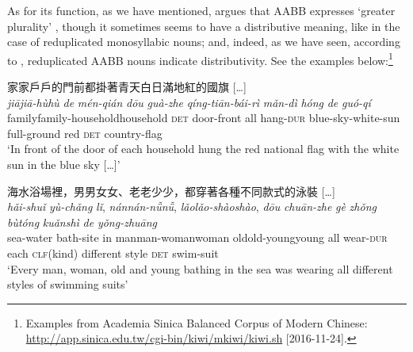 \documentclass[output=paper]{langsci/langscibook}
\begin{document}
As for its function, as we have mentioned, %
\citet{Zhang2015} %
%
argues that AABB
expresses `greater plurality' %
\citep[see also][]{Wu01}%
%
, though it
sometimes seems to have a distributive meaning, like in the case of
reduplicated monosyllabic nouns; and, indeed, as we have seen, according
to %
\citet[]{Xu2012a}%
%
, reduplicated AABB nouns indicate distributivity. See the
examples below:\footnote{Examples from Academia Sinica Balanced Corpus of
  Modern Chinese:
  \url{http://app.sinica.edu.tw/cgi-bin/kiwi/mkiwi/kiwi.sh}
  [2016-11-24].}

\ea\label{ex:BascianoMelloni:29}
\ea\label{ex:BascianoMelloni:29a} 家家戶戶的門前都掛著青天白日滿地紅的國旗 {[}\ldots{}{]}\\
\gll \emph{jiā\tld{}jiā-hù\tld{}hù} \emph{de} \emph{mén-qián} \emph{dōu}  \emph{guà-zhe} \emph{qíng-tiān-bái-rì} \emph{mǎn-dì} \emph{hóng} \emph{de} \emph{guó-qí} \\
family\emph{\tld{}}family-household\emph{\tld{}}household \textsc{det} door-front all hang-\textsc{dur} blue-sky-white-sun full-ground red \textsc{det} country-flag\\
\glt `In front of the door of each household hung the red national flag with
 the white sun in the blue sky {[}\ldots{}{]}'

\ex\label{ex:BascianoMelloni:29b} 海水浴場裡，男男女女、老老少少，都穿著各種不同款式的泳裝 {[}\ldots{}{]}\\
\gll \emph{hǎi-shuǐ} \emph{yù-chǎng} \emph{lǐ}, \emph{nán\tld{}nán-nǚ\tld{}nǚ}, \emph{lǎo\tld{}lǎo-shào\tld{}shào}, \emph{dōu} \emph{chuān-zhe} \emph{gè} \emph{zhǒng} \emph{bùtóng} \emph{kuǎnshì} \emph{de} \emph{yǒng-zhuāng}\\
sea-water bath-site in man\emph{\tld{}}man-woman\emph{\tld{}}woman old\emph{\tld{}}old-young\emph{\tld{}}young all wear-\textsc{dur} each \textsc{clf}(kind) different style \textsc{det} swim-suit\\
\glt `Every man, woman, old and young bathing in the sea was wearing all different styles of swimming suits'
\z\z
\end{document}
